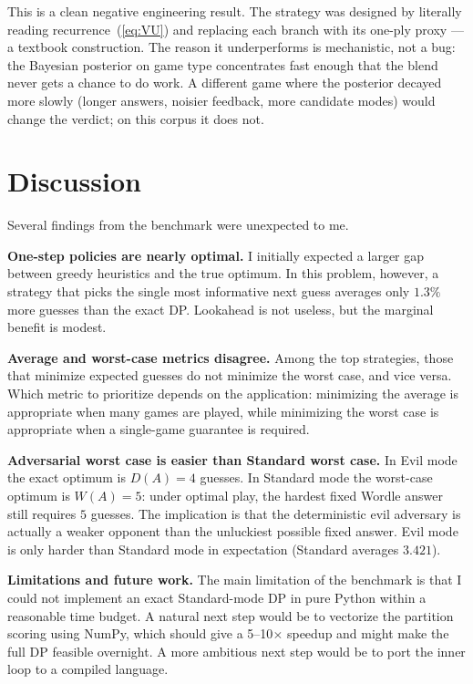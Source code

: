 \documentclass[11pt]{article}
\begin{document}
This is a clean negative engineering result. The strategy was
designed by literally reading recurrence~(\ref{eq:VU}) and replacing
each branch with its one-ply proxy --- a textbook construction. The
reason it underperforms is mechanistic, not a bug: the Bayesian
posterior on game type concentrates fast enough that the blend
never gets a chance to do work. A different game where the
posterior decayed more slowly (longer answers, noisier feedback,
more candidate modes) would change the verdict; on this corpus
it does not.

\section*{Discussion}

Several findings from the benchmark were unexpected to me.

\textbf{One-step policies are nearly optimal.} I initially expected a
larger gap between greedy heuristics and the true optimum. In this
problem, however, a strategy that picks the single most informative
next guess averages only $1.3\%$ more guesses than the exact DP.
Lookahead is not useless, but the marginal benefit is modest.

\textbf{Average and worst-case metrics disagree.} Among the top
strategies, those that minimize expected guesses do not minimize the
worst case, and vice versa. Which metric to prioritize depends on the
application: minimizing the average is appropriate when many games
are played, while minimizing the worst case is appropriate when a
single-game guarantee is required.

\textbf{Adversarial worst case is easier than Standard worst case.}
In Evil mode the exact optimum is $D(A) = 4$ guesses. In Standard
mode the worst-case optimum is $W(A) = 5$: under optimal play, the
hardest fixed Wordle answer still requires $5$ guesses. The implication
is that the deterministic evil adversary is actually a weaker opponent
than the unluckiest possible fixed answer. Evil mode is only harder
than Standard mode in expectation (Standard averages $3.421$).

\textbf{Limitations and future work.} The main limitation of the
benchmark is that I could not implement an exact Standard-mode DP in
pure Python within a reasonable time budget. A natural next step
would be to vectorize the partition scoring using NumPy, which should
give a 5--10$\times$ speedup and might make the full DP feasible
overnight. A more ambitious next step would be to port the inner loop
to a compiled language.
\end{document}

